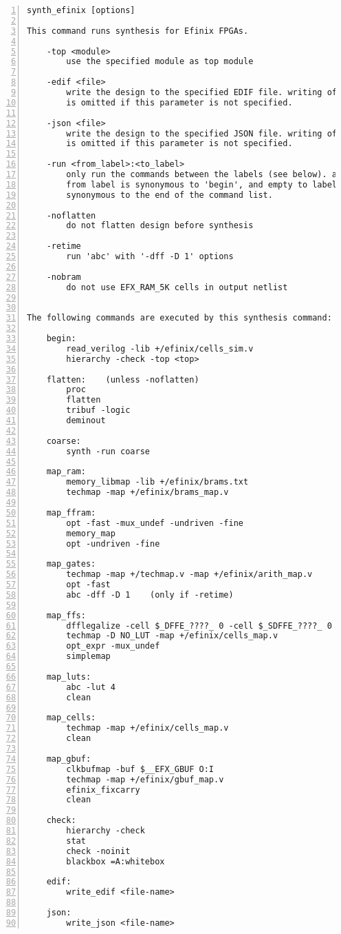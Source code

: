 \begin{lstlisting}[numbers=left,frame=single]
    synth_efinix [options]

This command runs synthesis for Efinix FPGAs.

    -top <module>
        use the specified module as top module

    -edif <file>
        write the design to the specified EDIF file. writing of an output file
        is omitted if this parameter is not specified.

    -json <file>
        write the design to the specified JSON file. writing of an output file
        is omitted if this parameter is not specified.

    -run <from_label>:<to_label>
        only run the commands between the labels (see below). an empty
        from label is synonymous to 'begin', and empty to label is
        synonymous to the end of the command list.

    -noflatten
        do not flatten design before synthesis

    -retime
        run 'abc' with '-dff -D 1' options

    -nobram
        do not use EFX_RAM_5K cells in output netlist


The following commands are executed by this synthesis command:

    begin:
        read_verilog -lib +/efinix/cells_sim.v
        hierarchy -check -top <top>

    flatten:    (unless -noflatten)
        proc
        flatten
        tribuf -logic
        deminout

    coarse:
        synth -run coarse

    map_ram:
        memory_libmap -lib +/efinix/brams.txt
        techmap -map +/efinix/brams_map.v

    map_ffram:
        opt -fast -mux_undef -undriven -fine
        memory_map
        opt -undriven -fine

    map_gates:
        techmap -map +/techmap.v -map +/efinix/arith_map.v
        opt -fast
        abc -dff -D 1    (only if -retime)

    map_ffs:
        dfflegalize -cell $_DFFE_????_ 0 -cell $_SDFFE_????_ 0 -cell $_SDFFCE_????_ 0 -cell $_DLATCH_?_ x
        techmap -D NO_LUT -map +/efinix/cells_map.v
        opt_expr -mux_undef
        simplemap

    map_luts:
        abc -lut 4
        clean

    map_cells:
        techmap -map +/efinix/cells_map.v
        clean

    map_gbuf:
        clkbufmap -buf $__EFX_GBUF O:I
        techmap -map +/efinix/gbuf_map.v
        efinix_fixcarry
        clean

    check:
        hierarchy -check
        stat
        check -noinit
        blackbox =A:whitebox

    edif:
        write_edif <file-name>

    json:
        write_json <file-name>
\end{lstlisting}

